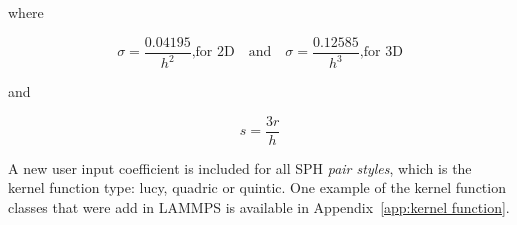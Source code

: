 where

\begin{equation}
 \sigma = \frac{0.04195}{h^2} \text{,for 2D} \quad \text{and} \quad \sigma = \frac{0.12585}{h^3} \text{,for 3D}
\end{equation}

and 

\begin{equation}
 s = \frac{3r}{h}
\end{equation}

A new user input coefficient is included for all SPH \textit{pair styles}, which is the kernel function type: lucy, quadric or quintic. One example of the kernel function classes
that were add in LAMMPS is available in Appendix~\ref{app:kernel function}.









